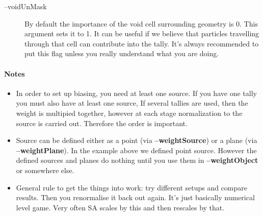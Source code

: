 \begin{description}
\item[--voidUnMask] By default the importance of the void cell surrounding geometry is 0. This argument sets it to 1.
  It can be useful if we believe that particles travelling through that cell can contribute into the tally.
  It's always recommended to put this flag unless you really understand what you are doing.
\end{description}

\paragraph{Notes}
\begin{itemize}
\item In order to set up biasing, you need at least one source. If you have one tally you must also have at least one source, If several tallies are used, then the weight is multipied together, however at each stage
  normalization to the source is carried out. Therefore the order is important.
\item Source can be defined either as a point (via {\bf --weightSource}) or a plane (via {\bf --weightPlane}). In the example above we defined point source.
  However the defined sources and planes do nothing until you use them in {\bf --weightObject} or somewhere else.
\item General rule to get the things into work: try different setups and compare results. Then you renormalise it back out again. It's just basically numerical level game.
  Very often SA scales by this and then rescales by that.
\end{itemize}




